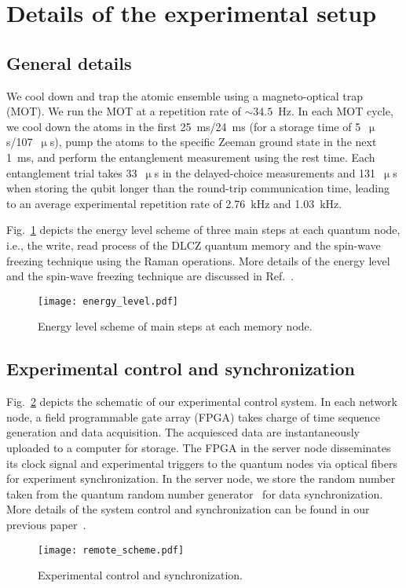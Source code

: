 \documentclass[aps,reprint,showpacs,superscriptaddress]{revtex4-2}
\begin{document}

\section{Details of the experimental setup}

\subsection{General details}
We cool down and trap the atomic ensemble using a magneto-optical trap (MOT). We run the MOT at a repetition rate of $\sim 34.5$~Hz. In each MOT cycle, we cool down the atoms in the first 25~ms/24~ms (for a storage time of 5~$\upmu$s/107~$\upmu$s), pump the atoms to the specific Zeeman ground state in the next 1~ms, and perform the entanglement measurement using the rest time. Each entanglement trial takes 33~$\upmu$s in the delayed-choice measurements and 131~$\upmu$s when storing the qubit longer than the round-trip communication time, leading to an average experimental repetition rate of 2.76~kHz and 1.03~kHz.

Fig.~\ref{fig:energylevel} depicts the energy level scheme of three main steps at each quantum node, i.e., the write, read process of the DLCZ quantum memory and the spin-wave freezing technique using the Raman operations. More details of the energy level and the spin-wave freezing technique are discussed in Ref.~\cite{luo2022sm}.

\begin{figure}[hbtp]
	\centering
	\texttt{[image: energy\_level.pdf]}
	\caption{Energy level scheme of main steps at each memory node.}
	\label{fig:energylevel}
\end{figure}

\subsection{Experimental control and synchronization}
Fig.~\ref{fig:controlsystem} depicts the schematic of our experimental control system. In each network node, a field programmable gate array (FPGA) takes charge of time sequence generation and data acquisition. The acquiesced data are instantaneously uploaded to a computer for storage. The FPGA in the server node disseminates its clock signal and experimental triggers to the quantum nodes via optical fibers for experiment synchronization. In the server node, we store the random number taken from the quantum random number generator~\cite{nie2015sm} for data synchronization. More details of the system control and synchronization can be found in our previous paper~\cite{luo2022sm}.
\begin{figure}[htbp]
	\centering
	\texttt{[image: remote\_scheme.pdf]}
	\caption{Experimental control and synchronization.}
	\label{fig:controlsystem}
\end{figure}
\end{document}
